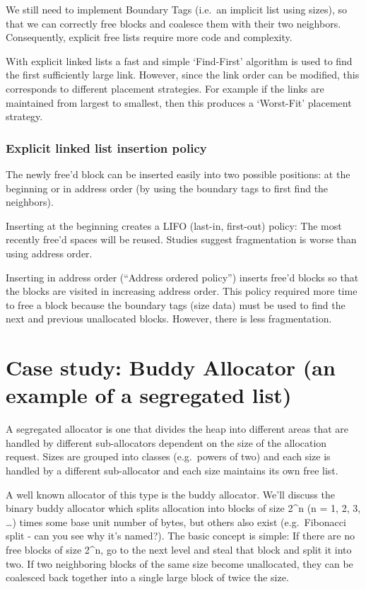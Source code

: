 We still need to implement Boundary Tags (i.e.~an implicit list using
sizes), so that we can correctly free blocks and coalesce them with
their two neighbors. Consequently, explicit free lists require more code
and complexity.

With explicit linked lists a fast and simple `Find-First' algorithm is
used to find the first sufficiently large link. However, since the link
order can be modified, this corresponds to different placement
strategies. For example if the links are maintained from largest to
smallest, then this produces a `Worst-Fit' placement strategy.

\subsubsection{Explicit linked list insertion
policy}\label{explicit-linked-list-insertion-policy}

The newly free'd block can be inserted easily into two possible
positions: at the beginning or in address order (by using the boundary
tags to first find the neighbors).

Inserting at the beginning creates a LIFO (last-in, first-out) policy:
The most recently free'd spaces will be reused. Studies suggest
fragmentation is worse than using address order.

Inserting in address order (``Address ordered policy'') inserts free'd
blocks so that the blocks are visited in increasing address order. This
policy required more time to free a block because the boundary tags
(size data) must be used to find the next and previous unallocated
blocks. However, there is less fragmentation.

\section{Case study: Buddy Allocator (an example of a segregated
list)}\label{case-study-buddy-allocator-an-example-of-a-segregated-list}

A segregated allocator is one that divides the heap into different areas
that are handled by different sub-allocators dependent on the size of
the allocation request. Sizes are grouped into classes (e.g.~powers of
two) and each size is handled by a different sub-allocator and each size
maintains its own free list.

A well known allocator of this type is the buddy allocator. We'll
discuss the binary buddy allocator which splits allocation into blocks
of size 2\^{}n (n = 1, 2, 3, \ldots{}) times some base unit number of
bytes, but others also exist (e.g.~Fibonacci split - can you see why
it's named?). The basic concept is simple: If there are no free blocks
of size 2\^{}n, go to the next level and steal that block and split it
into two. If two neighboring blocks of the same size become unallocated,
they can be coalesced back together into a single large block of twice
the size.

